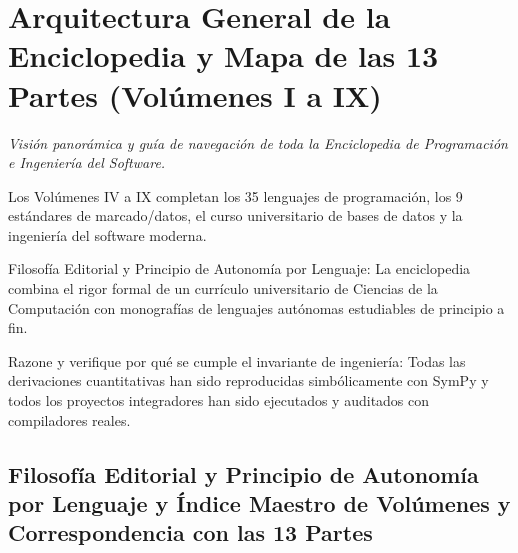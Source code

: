 \documentclass{book}
\begin{document}
\chapter{Arquitectura General de la Enciclopedia y Mapa de las 13 Partes (Volúmenes I a IX)}
\label{chap:ch-01}

\noindent\textit{Visión panorámica y guía de navegación de toda la Enciclopedia de Programación e Ingeniería del Software.}

\begin{tcolorbox}[title={Consejo}, studiumtip, breakable]

Los Volúmenes IV a IX completan los 35 lenguajes de programación, los 9 estándares de marcado/datos, el curso universitario de bases de datos y la ingeniería del software moderna.
\end{tcolorbox}

\begin{tcolorbox}[title={Definición}, studiumdef, breakable]

Filosofía Editorial y Principio de Autonomía por Lenguaje: La enciclopedia combina el rigor formal de un currículo universitario de Ciencias de la Computación con monografías de lenguajes autónomas estudiables de principio a fin.
\end{tcolorbox}

\begin{tcolorbox}[title={Autoficha}, studiumcheck, breakable]

Razone y verifique por qué se cumple el invariante de ingeniería: Todas las derivaciones cuantitativas han sido reproducidas simbólicamente con SymPy y todos los proyectos integradores han sido ejecutados y auditados con compiladores reales.
\end{tcolorbox}

\section{Filosofía Editorial y Principio de Autonomía por Lenguaje y Índice Maestro de Volúmenes y Correspondencia con las 13 Partes}
\end{document}
